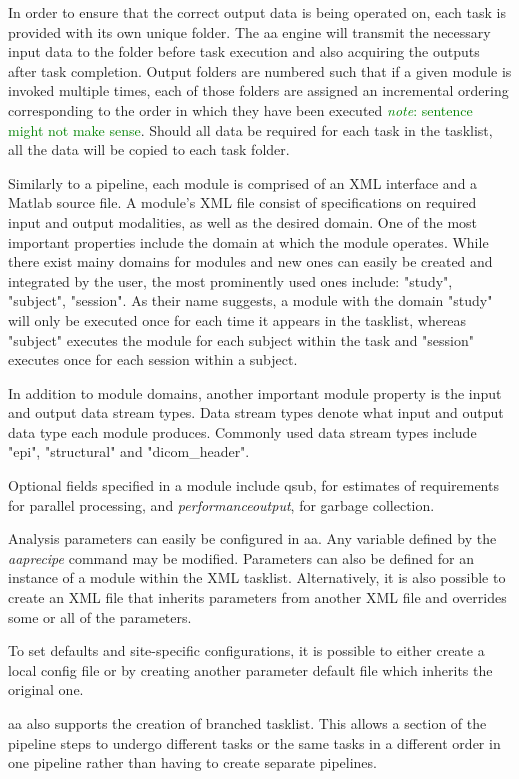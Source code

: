 \documentclass{report}
\newcommand{\note}[1]{\textcolor{green}{\textit{note}: #1}}
\begin{document}
        In order to ensure that the correct output data is being operated on,
each task is provided with its own unique folder. The aa engine will transmit
the necessary input data to the folder before task execution and also
acquiring the outputs after task completion. Output folders are numbered such
that if a given module is invoked multiple times, each of those folders are
assigned an incremental ordering corresponding to the order in which they have been
executed \note{sentence might not make sense}. Should all data be required for
each task in the tasklist, all the data will be copied to each task folder.


    Similarly to a pipeline, each module is comprised of an XML interface and a
Matlab source file. A module's XML file consist of specifications on required input
and output modalities, as well as the desired domain. One of the most important
properties include the domain at which the module operates. While there exist mainy domains for
modules and new ones can easily be created and integrated by the user, the most
prominently used ones include: "study", "subject", "session". As their name suggests, a
module with the domain "study" will only be executed once for each time it
appears in the tasklist, whereas "subject" executes the module for each subject
within the task and "session" executes once for each session within a subject. 
 
    In addition to module domains, another important module property is the
input and output data stream types. Data stream types denote what input and
output data type each module produces. Commonly used data stream
types include "epi", "structural" and "dicom\_header".

    Optional fields specified in a module include qsub, for estimates of
requirements for parallel processing,
and \textit{performanceoutput}, for garbage collection.  

   Analysis parameters can easily be configured in aa. Any variable defined by
the \textit{aaprecipe} command may be modified. Parameters can also be defined
for an instance of a module within the XML tasklist. Alternatively, it is also
possible to create an XML file that inherits parameters from another XML file
and overrides some or all of the parameters.

   To set defaults and site-specific configurations, it is possible to either
create a local config file or by creating another parameter default file which
inherits the original one.   

    aa also supports the creation of branched tasklist. This allows a section of
the pipeline steps to undergo different tasks or the same tasks in a different
order in one pipeline rather than having to create separate pipelines.
\end{document}

